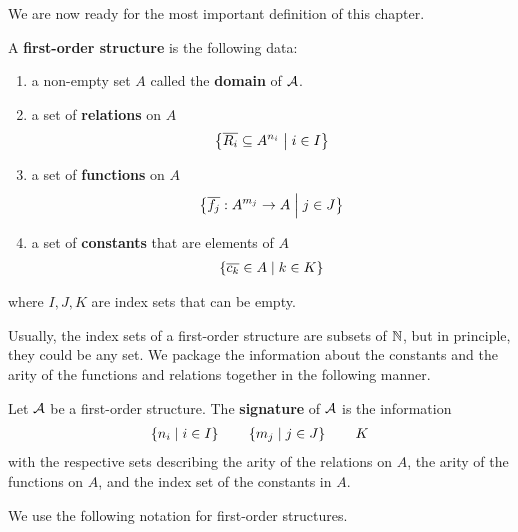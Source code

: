 We are now ready for the most important definition of this chapter.

\begin{boxdefinition}\label{Ch2:Def:First-Order_Structure}
    A \textbf{first-order structure} is the following data:
    \begin{enumerate}
        \item a non-empty set $A$ called the \textbf{domain} of $\mathcal{A}$.
        
        \item a set of \textbf{relations} on $A$
        \begin{align*}
            \left\{ \overline{R_i} \subseteq A^{n_i} \; \middle\vert \; i \in I \right\}
        \end{align*}

        \item a set of \textbf{functions} on $A$
        \begin{align*}
            \left\{ \overline{f_j} : A^{m_j} \to A \; \middle\vert \; j \in J \right\}
        \end{align*}

        \item a set of \textbf{constants} that are elements of $A$
        \begin{align*}
            \left\{ \overline{c_k} \in A \; \middle\vert \; k \in K \right\}
        \end{align*}
    \end{enumerate}
    where $I, J, K$ are index sets that can be empty.
\end{boxdefinition}

Usually, the index sets of a first-order structure are subsets of $\mathbb{N}$, but in principle, they could be any set. We package the information about the constants and the arity of the functions and relations together in the following manner.

\begin{boxdefinition}[Signature]
    Let $\mathcal{A}$ be a first-order structure. The \textbf{signature} of $\mathcal{A}$ is the information
    \begin{align*}
        \left\{ n_i \; \middle\vert \; i \in I \right\}
        \qquad
        \left\{ m_j \; \middle\vert \; j \in J \right\}
        \qquad
        K
    \end{align*}
    with the respective sets describing the arity of the relations on $A$, the arity of the functions on $A$, and the index set of the constants in $A$.
\end{boxdefinition}

We use the following notation for first-order structures.

